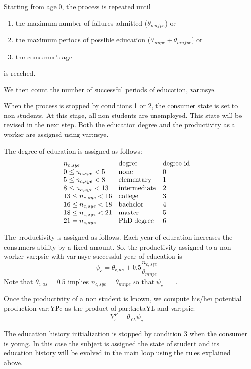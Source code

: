 \documentclass{book}
\begin{document}
\vskip5mm


Starting from age 0, the process is repeated until 
\begin{enumerate}
	\item the maximum number of failures admitted ($\theta_{mnfpe}$) or
	\item the maximum periods of possible education ($\theta_{mnpe}+\theta_{mnfpe}$) or
	\item the consumer's age 
\end{enumerate}
is reached.

We then count the number of successful periods of education, \gls{var:nsye}. 

When the process is stopped by conditions 1 or 2, the consumer state is set to non students. At this stage, all non students are unemployed. This state will be revised in the next step. Both the education degree and the productivity as a worker are assigned using \gls{var:nsye}. 

The degree of education is assigned as follows:
\[
	\begin{array}{l l l}
		n_{c,sye}& \textnormal{degree}& \textnormal{degree id}\\
	0\le n_{c,sye}<5 & \textnormal{none}&0\\
	5\le n_{c,sye}<8 & \textnormal{elementary}&1\\
	8\le n_{c,sye}<13 & \textnormal{intermediate}&2\\
	13\le n_{c,sye}<16 & \textnormal{college}&3\\
	16\le n_{c,sye}<18 & \textnormal{bachelor}&4\\
	18\le n_{c,sye}<21 & \textnormal{master}&5\\
	21= n_{c,sye} & \textnormal{PhD degree}&6
	\end{array}
\]

The productivity is assigned as follows. Each year of education increases the consumers ability by a fixed amount. So, the productivity assigned to a non worker \gls{var:psic} with \gls{var:nsye} successful year of education is
\[
	\psi_c=\theta_{c,as}+0.5\frac{n_{c,sye}}{\theta_{mnpe}}
\]
Note that $\theta_{c,as}=0.5$ implies $n_{c,sye}=\theta_{mnpe}$ so that $\psi_c=1$.

Once the productivity of a non student is known, we compute his/her potential production \gls{var:YPc} as the product of \gls{par:thetaYL} and \gls{var:psic}: 
\[Y^{P}_c=\theta_{YL}\psi_c\]

The education history initialization is stopped by condition 3 when the consumer is young. In this case the subject is assigned the state of student and its education history will be evolved in the main loop using the rules explained above.
\end{document}
